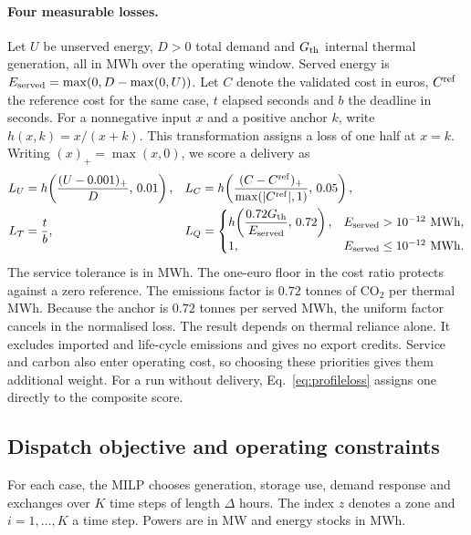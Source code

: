 \documentclass[11pt,a4paper]{article}
\newcommand{\CO}{CO$_2$}
\begin{document}
\paragraph{Four measurable losses.}
Let \(U\) be unserved energy, \(D>0\) total demand and \(G_{\rm th}\) internal thermal generation, all in MWh over the operating window. Served energy is \(E_{\rm served}=\max(0,D-\max(0,U))\). Let \(C\) denote the validated cost in euros, \(C^{\rm ref}\) the reference cost for the same case, \(t\) elapsed seconds and \(b\) the deadline in seconds. For a nonnegative input \(x\) and a positive anchor \(k\), write \(h(x,k)=x/(x+k)\). This transformation assigns a loss of one half at \(x=k\). Writing \((x)_+=\max(x,0)\), we score a delivery as
\begin{align}
 L_U &= h\!\left(\frac{(U-0.001)_+}{D},\,0.01\right), &
 L_C &= h\!\left(\frac{(C-C^{\rm ref})_+}{\max(|C^{\rm ref}|,1)},\,0.05\right),\nonumber\\
 L_T &= \frac{t}{b}, &
 L_Q &=
 \begin{cases}
 h\!\left(\dfrac{0.72G_{\rm th}}{E_{\rm served}},\,0.72\right), & E_{\rm served}>10^{-12}\ \mathrm{MWh},\\
 1, & E_{\rm served}\leq10^{-12}\ \mathrm{MWh}.
 \end{cases}
 \label{eq:losses}
\end{align}
The service tolerance is in MWh. The one-euro floor in the cost ratio protects against a zero reference. The emissions factor is \(0.72\) tonnes of \CO{} per thermal MWh. Because the anchor is \(0.72\) tonnes per served MWh, the uniform factor cancels in the normalised loss. The result depends on thermal reliance alone. It excludes imported and life-cycle emissions and gives no export credits. Service and carbon also enter operating cost, so choosing these priorities gives them additional weight. For a run without delivery, Eq.~\eqref{eq:profileloss} assigns one directly to the composite score.

\subsection{Dispatch objective and operating constraints}
\label{app:milp}

For each case, the MILP chooses generation, storage use, demand response and exchanges over \(K\) time steps of length \(\Delta\) hours. The index \(z\) denotes a zone and \(i=1,\ldots,K\) a time step. Powers are in MW and energy stocks in MWh.
\end{document}
